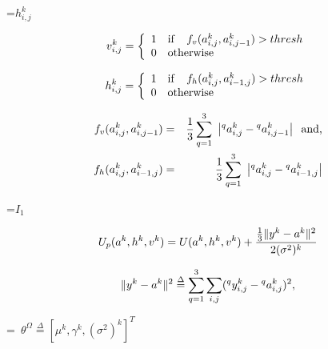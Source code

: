{\newpage
\clearpage
\samepage \setbox\sizebox=\hbox{$h^k_{i,j}$}\box\sizebox
}

{\newpage
\clearpage
\samepage \begin{displaymath}v^k_{i,j}= \left \{ \begin{array}{cl}
                    1& \mbox{if} \;\;\;\; f_v(a_{i,j}^k, 
a_{i,j-1}^k) > thresh  \\ 
                    0 & \mbox{otherwise}
                    \end{array}
                 \right .   
\end{displaymath}
}

{\newpage
\clearpage
\samepage \begin{displaymath}h^k_{i,j}= \left \{ \begin{array}{cl}
                    1& \mbox{if} \;\;\;\; f_h(a_{i,j}^k, 
a_{i-1,j}^k) > thresh  \\ 
                    0 & \mbox{otherwise}
                    \end{array}
                 \right .   
\end{displaymath}
}

{\newpage
\clearpage
\samepage \begin{eqnarray}f_v(a_{i,j}^k, a_{i,j-1}^k)&=&\frac{1}{3} 
 \sum_{q=1}^{3}\ \left |  ^qa_{i,j}^k - {^qa_{i,j-1}^k}\right | \;\; 
 \mbox{and,} \nonumber
  \\ 
 f_h(a_{i,j}^k, a_{i-1,j}^k)&=&\frac{1}{3}  
 \sum_{q=1}^{3}\ \left | ^qa_{i,j}^k - {^qa_{i-1,j}^k} \right |  
 \label{eq:line}
 \end{eqnarray}
}

{\newpage
\clearpage
\samepage \setbox\sizebox=\hbox{$I_1$}\box\sizebox
}

{\newpage
\clearpage
\samepage \begin{eqnarray}U_{p}(a^k,h^k,v^k) = U(a^k,h^k,v^k) + 
\frac{ \frac{1}{3} \|y^k-a^k\|^2}{2 (\sigma^2)^k}
\label{eq:cir_energy}
\end{eqnarray}
}

{\newpage
\clearpage
\samepage \begin{displaymath}\| y^k-a^k \|^2 \stackrel{\Delta}{=}
   \sum_{q=1}^3
\sum_{i,j}  (^qy^k_{i,j} - {^qa^k_{i,j}})^2, \end{displaymath}
}

{\newpage
\clearpage
\samepage \setbox\sizebox=\hbox{%
$\theta^\Omega
  \stackrel{\Delta}{=} [ \mu^k, \gamma^k, 
(\sigma^2)^k]^T$}\box\sizebox
}

